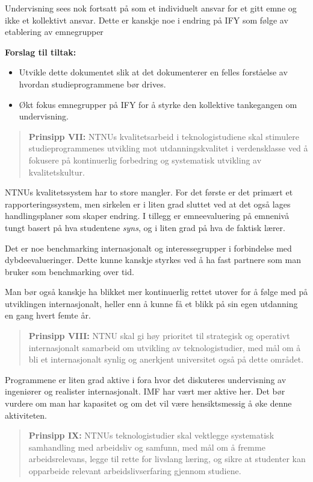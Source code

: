 Undervisning sees nok fortsatt på som et individuelt ansvar for et gitt emne og ikke et kollektivt ansvar. Dette er kanskje noe i endring på IFY som følge av etablering av emnegrupper

\textbf{Forslag til tiltak:}

\begin{itemize}
	\item Utvikle dette dokumentet slik at det dokumenterer en felles forståelse av hvordan studieprogrammene bør drives.
	\item Økt fokus emnegrupper på IFY for å styrke den kollektive tankegangen om undervisning.
\end{itemize}

\begin{quote}
	\textbf{Prinsipp VII:} NTNUs kvalitetsarbeid i teknologistudiene skal stimulere studieprogrammenes utvikling mot utdanningskvalitet i verdensklasse ved å fokusere på kontinuerlig forbedring og systematisk utvikling av kvalitetskultur.
\end{quote}

NTNUs kvalitetssystem har to store mangler. For det første er det primært et rapporteringssystem, men sirkelen er i liten grad sluttet ved at det også lages handlingsplaner som skaper endring. I tillegg er emneevaluering på emnenivå tungt basert på hva studentene \emph{syns}, og i liten grad på hva de faktisk lærer. 

Det er noe benchmarking internasjonalt og interessegrupper i forbindelse med dybdeevalueringer. Dette kunne kanskje styrkes ved å ha fast partnere som man bruker som benchmarking over tid. 

Man bør også kanskje ha blikket mer kontinuerlig rettet utover for å følge med på utviklingen internasjonalt, heller enn å kunne få et blikk på sin egen utdanning en gang hvert femte år.

\begin{quote}
	\textbf{Prinsipp VIII:} NTNU skal gi høy prioritet til strategisk og operativt internasjonalt samarbeid om utvikling av teknologistudier, med mål om å bli et internasjonalt synlig og anerkjent universitet også på dette området.
\end{quote}

Programmene er liten grad aktive i fora hvor det diskuteres undervisning av ingeniører og realister internasjonalt. IMF har vært mer aktive her. Det bør vurdere om man har kapasitet og om det vil være hensiktsmessig å øke denne aktiviteten.

\begin{quote}
	\textbf{Prinsipp IX:} NTNUs teknologistudier skal vektlegge systematisk samhandling med arbeidsliv og samfunn, med mål om å fremme arbeidsrelevans, legge til rette for livslang læring, og sikre at studenter kan opparbeide relevant arbeidslivserfaring gjennom studiene.
\end{quote}


